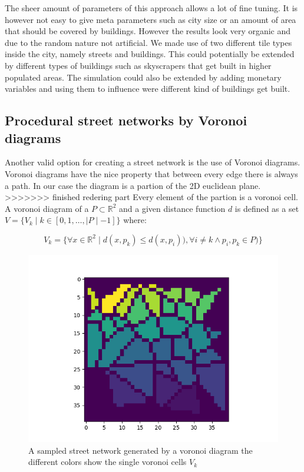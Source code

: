 \documentclass{scrartcl}
\begin{document}
The sheer amount of parameters of this approach allows a lot of fine tuning.
It is however not easy to give meta parameters such as city size or an amount
of area that should be covered by buildings. However the results look very organic
and due to the random nature not artificial. We made use of two different tile types
inside the city, namely streets and buildings. This could potentially be extended
by different types of buildings such as skyscrapers that get built in higher
populated areas. The simulation could also be extended by adding monetary variables
and using them to influence were different kind of buildings get built.


\subsection{Procedural street networks by Voronoi diagrams}

Another valid option for creating a street network is the use of Voronoi diagrams.
Voronoi diagrams have the nice property that between every edge there is always a path.
In our case the diagram is a partion of the 2D euclidean plane.
>>>>>>> finished redering part
Every element of the partion is a voronoi cell.
A voronoi diagram of a  $ P \subset \mathbb{R}^2 $ and a given distance 
function $d$ is defined as a set $V=\lbrace V_k \mid k \in [0,1,\ldots,\mid P\mid-1] \rbrace$ where:

\[
    V_k=\lbrace \forall x \in \mathbb{R}^2 \mid d(x,p_k) \leq d(x,p_i)), \forall i \ne k \land p_i,p_k \in P ) \rbrace
\]

\begin{figure}
    \centering
    \includegraphics[scale = 0.5]{voro}
    \caption{A sampled street network generated by a voronoi diagram
    the different colors show the single voronoi cells $V_k$}
    \label{fig:voronoi}
\end{figure}
\end{document}
